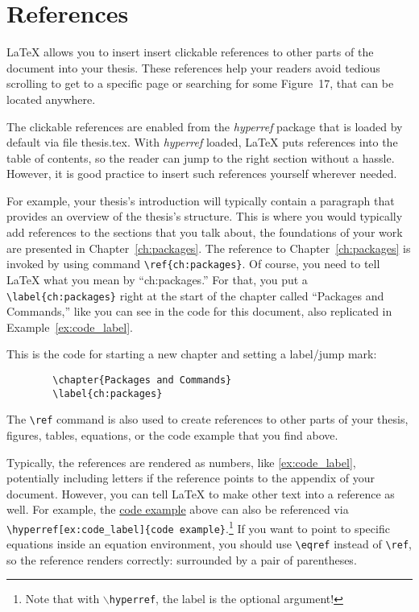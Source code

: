 \section{References}
\label{sec:guide:references}
\LaTeX{} allows you to insert insert clickable references to other parts of the
document into your thesis.
These references help your readers avoid tedious scrolling to get to a specific
page or searching for some Figure~17, that can be located anywhere.

The clickable references are enabled from the \emph{hyperref} package that is
loaded by default via file \mbox{thesis.tex}. 
With \emph{hyperref} loaded, \LaTeX{} puts references into the table of
contents, so the reader can jump to the right section without a hassle.
However, it is good practice to insert such references yourself wherever
needed.

For example, your thesis's introduction will typically contain a paragraph that
provides an overview of the thesis's structure.
This is where you would typically add references to the sections that you talk
about, \eg{} the foundations of your work are presented in
Chapter~\ref{ch:packages}.
The reference to Chapter~\ref{ch:packages} is invoked by using command
\verb+\ref{ch:packages}+.
Of course, you need to tell \LaTeX{} what you mean by ``ch:packages.''
For that, you put a \verb+\label{ch:packages}+ right at the start of the
chapter called ``Packages and Commands,'' like you can see in the code for this
document, also replicated in Example~\ref{ex:code_label}.

\begin{example}
	\label{ex:code_label}
	This is the code for starting a new chapter and setting a label/jump
	mark:
	\begin{verbatim}
		\chapter{Packages and Commands}
		\label{ch:packages}
	\end{verbatim}
\end{example}
The \verb+\ref+ command is also used to create references to other parts of
your thesis, \eg{} figures, tables, equations, or the code example that you
find above. 

Typically, the references are rendered as numbers, like \ref{ex:code_label},
potentially including letters if the reference points to the appendix of your
document.
However, you can tell \LaTeX{} to make other text into a reference as well.
For example, the \hyperref[ex:code_label]{code example} above can also be
referenced via \verb+\hyperref[ex:code_label]{code example}+.\footnote{Note
that with \texttt{\(\backslash\)hyperref}, the label is the optional
argument!}
If you want to point to specific equations inside an equation environment, you
should use \verb+\eqref+ instead of \verb+\ref+, so the reference renders
correctly: surrounded by a pair of parentheses.

